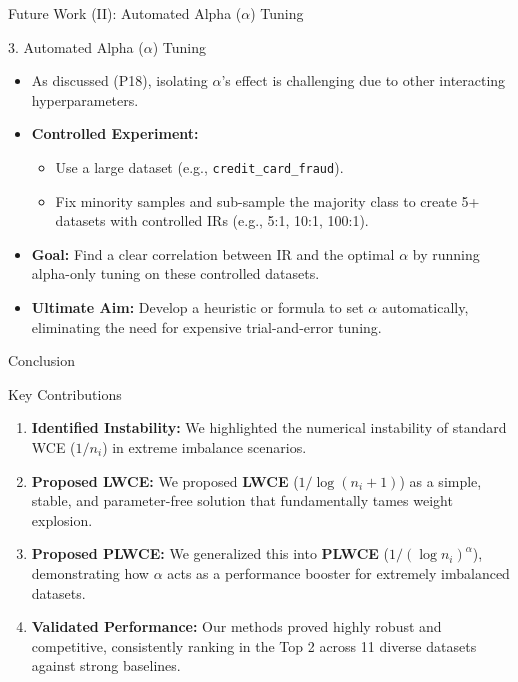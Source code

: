 \documentclass[aspectratio=169]{beamer}
\def \bblock{\begin{beamerboxesrounded}[upper=uppercolor,lower=lowercolor,shadow=true]}
\def \eblock{\end{beamerboxesrounded}}
\begin{document}
\begin{frame}{Future Work (II): Automated Alpha ($\alpha$) Tuning}

\vspace{0.05\textwidth}

\bblock{3. Automated Alpha ($\alpha$) Tuning}
    \begin{itemize}
        \item As discussed (P18), isolating $\alpha$'s effect is challenging due to other interacting hyperparameters.
        \vfill
        \item \textbf{Controlled Experiment:}
        \begin{itemize}
            \item Use a large dataset (e.g., \texttt{credit\_card\_fraud}).
            \item Fix minority samples and \alert{sub-sample the majority class} to create 5+ datasets with controlled IRs (e.g., 5:1, 10:1, 100:1).
        \end{itemize}
        \vfill
        \item \textbf{Goal:} Find a clear correlation between \alert{IR} and the \alert{optimal $\alpha$} by running alpha-only tuning on these controlled datasets.
        \vfill
        \item \textbf{Ultimate Aim:} Develop a heuristic or formula to set $\alpha$ \alert{automatically}, eliminating the need for expensive trial-and-error tuning.
    \end{itemize}
\eblock

\end{frame}

\begin{frame}{Conclusion}

\vspace{0.03\textwidth}
\bblock{Key Contributions}
    \begin{enumerate}
        \item \textbf{Identified Instability:} We highlighted the numerical instability of standard WCE ($1/n_i$) in extreme imbalance scenarios.
        \vfill
        \item \textbf{Proposed LWCE:} We proposed \textbf{LWCE} ($1/\log(n_i+1)$) as a simple, stable, and parameter-free solution that fundamentally tames weight explosion.
        \vfill
        \item \textbf{Proposed PLWCE:} We generalized this into \textbf{PLWCE} ($1/(\log n_i)^\alpha$), demonstrating how $\alpha$ acts as a performance booster for extremely imbalanced datasets.
        \vfill
        \item \textbf{Validated Performance:} Our methods proved \alert{highly robust and competitive}, consistently ranking in the Top 2 across 11 diverse datasets against strong baselines.
    \end{enumerate}
\eblock

\end{frame}
\end{document}
